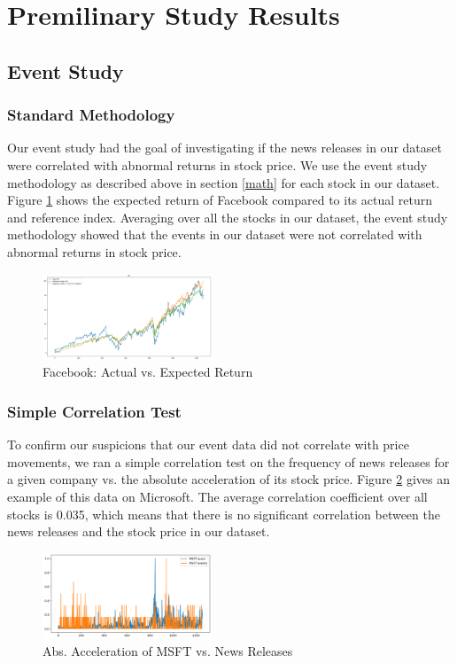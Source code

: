 \documentclass[conference]{IEEEtran}
\begin{document}
\section{Premilinary Study Results}
\subsection{Event Study}
\subsubsection{Standard Methodology}
Our event study had the goal of investigating if the news releases in our dataset were correlated with abnormal returns in stock price. We use the event study methodology as described above in section \ref{math} for each stock in our dataset. Figure \ref{fig:expected} shows the expected return of Facebook compared to its actual return and reference index. Averaging over all the stocks in our dataset, the event study methodology showed that the events in our dataset were not correlated with abnormal returns in stock price.
\begin{figure}[ht]
    \centering
    \includegraphics[width=0.45\textwidth]{FBExpectedValues.png}
    \caption{Facebook: Actual vs. Expected Return}
    \label{fig:expected}
\end{figure} 
\subsubsection{Simple Correlation Test}
To confirm our suspicions that our event data did not correlate with price movements, we ran a simple correlation test on the frequency of news releases for a given company vs. the absolute acceleration of its stock price. Figure \ref{fig:acceleartion} gives an example of this data on Microsoft. The average correlation coefficient over all stocks is 0.035, which means that there is no significant correlation between the news releases and the stock price in our dataset.
\begin{figure}[ht]
    \centering
    \includegraphics[width=0.45\textwidth]{MSFTevents.png}
    \caption{Abs. Acceleration of MSFT vs. News Releases}
    \label{fig:acceleartion}
\end{figure}
\end{document}
